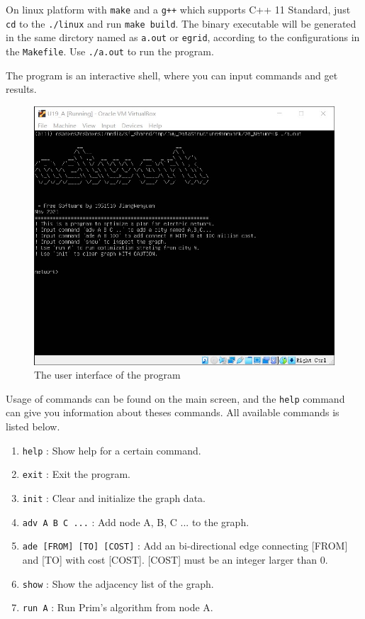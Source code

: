 \documentclass[cn,black,12pt,normal]{elegantnote}
\begin{document}
On linux platform with \lstinline{make} and a \lstinline{g++} which supports C++ 11 Standard, just \lstinline{cd} to the \lstinline{./linux} and run \lstinline{make build}. The binary executable will be generated in the same dirctory named as \lstinline{a.out} or \lstinline{egrid}, according to the configurations in the \lstinline{Makefile}. Use \lstinline{./a.out} to run the program.

The program is an interactive shell, where you can input commands and get results.

\begin{figure}[H]
    \centering
    \includegraphics[width=0.7\linewidth]{image/grid_01.jpg}
    \caption{The user interface of the program}
\end{figure}

Usage of commands can be found on the main screen, and the \lstinline{help} command can give you information about theses commands.  All available commands is listed below.

\begin{enumerate}
    \item \lstinline{help} : Show help for a certain command.
    \item \lstinline{exit} : Exit the program.
    \item \lstinline{init} : Clear and initialize the graph data.
    \item \lstinline{adv A B C ...} : Add node A, B, C ... to the graph.
    \item \lstinline{ade [FROM] [TO] [COST]} : Add an bi-directional edge connecting [FROM] and [TO] with cost [COST]. [COST] must be an integer larger than 0.
    \item \lstinline{show} : Show the adjacency list of the graph.
    \item \lstinline{run A} : Run Prim's algorithm from node A.
\end{enumerate}
\end{document}
